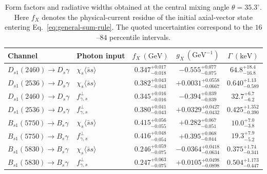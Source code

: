\documentclass[aps,prd,preprint,nofootinbib,superscriptaddress]{revtex4-2}
\newcommand{\Ds}{D_s}
\newcommand{\Dsone}{D_{s1}}
\newcommand{\Bs}{B_s}
\newcommand{\Bsone}{B_{s1}}
\newcommand{\GeV}{\mathrm{GeV}}
\newcommand{\keV}{\mathrm{keV}}
\begin{document}
\begin{widetext}
\begin{table}[t]
\caption{Form factors and radiative widths obtained at the central mixing
angle $\theta=35.3^\circ$.  Here $f_X$ denotes the physical-current residue of
the initial axial-vector state entering Eq.~\eqref{eq:general-sum-rule}.  The
quoted uncertainties correspond to the $16$--$84$ percentile intervals.}
\label{tab:results}
\scriptsize
\begin{ruledtabular}
\begin{tabular}{llccc}
Channel & Photon input & $f_X~(\GeV)$
& $g_X~(\GeV^{-1})$ & $\Gamma~(\keV)$\\
\hline
$\Dsone(2460)\to\Ds\gamma$
& $\chi_s\langle\bar s s\rangle$
& $0.347^{+0.017}_{-0.018}$
& $-0.555^{+0.077}_{-0.075}$
& $64.8^{+18.4}_{-16.8}$\\

$\Dsone(2536)\to\Ds\gamma$
& $\chi_s\langle\bar s s\rangle$
& $0.382^{+0.043}_{-0.043}$
& $+0.0031^{+0.0558}_{-0.0667}$
& $0.640^{+1.13}_{-0.589}$\\

$\Dsone(2460)\to\Ds\gamma$
& $f_{\gamma,s}^{\perp}$
& $0.345^{+0.016}_{-0.016}$
& $-0.394^{+0.039}_{-0.039}$
& $32.7^{+6.7}_{-6.2}$\\

$\Dsone(2536)\to\Ds\gamma$
& $f_{\gamma,s}^{\perp}$
& $0.380^{+0.041}_{-0.043}$
& $+0.0329^{+0.0427}_{-0.0432}$
& $0.425^{+1.352}_{-0.390}$\\

$\Bsone(5750)\to\Bs\gamma$
& $\chi_s\langle\bar s s\rangle$
& $0.415^{+0.056}_{-0.055}$
& $+0.282^{+0.067}_{-0.051}$
& $10.0^{+7.0}_{-3.8}$\\

$\Bsone(5750)\to\Bs\gamma$
& $f_{\gamma,s}^{\perp}$
& $0.416^{+0.048}_{-0.054}$
& $+0.395^{+0.068}_{-0.044}$
& $19.3^{+7.9}_{-5.2}$\\

$\Bsone(5830)\to\Bs\gamma$
& $\chi_s\langle\bar s s\rangle$
& $0.246^{+0.059}_{-0.075}$
& $-0.0364^{+0.0418}_{-0.0634}$
& $0.375^{+1.74}_{-0.341}$\\

$\Bsone(5830)\to\Bs\gamma$
& $f_{\gamma,s}^{\perp}$
& $0.247^{+0.063}_{-0.075}$
& $+0.0105^{+0.0498}_{-0.0898}$
& $0.504^{+1.173}_{-0.447}$\\
\end{tabular}
\end{ruledtabular}
\end{table}
\end{widetext}
\end{document}
